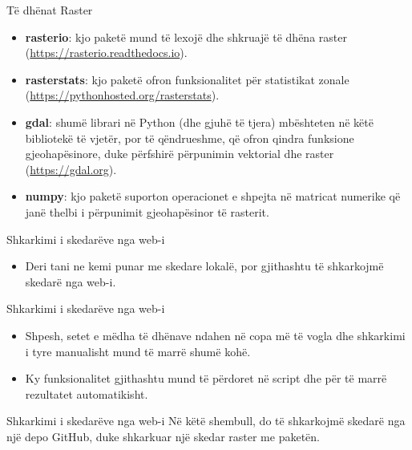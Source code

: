 \documentclass[
  ignorenonframetext,
]{beamer}
\providecommand{\tightlist}{%
  \setlength{\itemsep}{0pt}\setlength{\parskip}{0pt}}
\begin{document}
\begin{frame}{Të dhënat Raster}
\protect\hypertarget{tuxeb-dhuxebnat-raster-7}{}
\begin{itemize}
\item
  \textbf{rasterio}: kjo paketë mund të lexojë dhe shkruajë të dhëna
  raster (\url{https://rasterio.readthedocs.io}).
\item
  \textbf{rasterstats}: kjo paketë ofron funksionalitet për statistikat
  zonale (\url{https://pythonhosted.org/rasterstats}).
\item
  \textbf{gdal}: shumë librari në Python (dhe gjuhë të tjera) mbështeten
  në këtë bibliotekë të vjetër, por të qëndrueshme, që ofron qindra
  funksione gjeohapësinore, duke përfshirë përpunimin vektorial dhe
  raster (\url{https://gdal.org}).
\item
  \textbf{numpy}: kjo paketë suporton operacionet e shpejta në matricat
  numerike që janë thelbi i përpunimit gjeohapësinor të rasterit.
\end{itemize}
\end{frame}

\begin{frame}{Shkarkimi i skedarëve nga web-i}
\protect\hypertarget{shkarkimi-i-skedaruxebve-nga-web-i}{}
\begin{itemize}
\tightlist
\item
  Deri tani ne kemi punar me skedare lokalë, por gjithashtu të
  shkarkojmë skedarë nga web-i.
\end{itemize}
\end{frame}

\begin{frame}{Shkarkimi i skedarëve nga web-i}
\protect\hypertarget{shkarkimi-i-skedaruxebve-nga-web-i-1}{}
\begin{itemize}
\item
  Shpesh, setet e mëdha të dhënave ndahen në copa më të vogla dhe
  shkarkimi i tyre manualisht mund të marrë shumë kohë.
\item
  Ky funksionalitet gjithashtu mund të përdoret në script dhe për të
  marrë rezultatet automatikisht.
\end{itemize}
\end{frame}

\begin{frame}{Shkarkimi i skedarëve nga web-i}
\protect\hypertarget{shkarkimi-i-skedaruxebve-nga-web-i-2}{}
Në këtë shembull, do të shkarkojmë skedarë nga një depo GitHub, duke
shkarkuar një skedar raster me paketën.
\end{frame}
\end{document}
